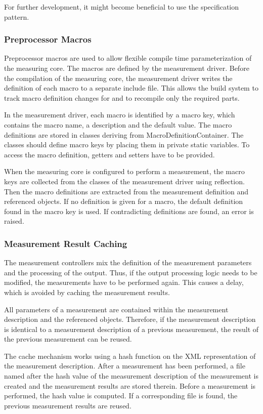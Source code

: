 \documentclass[a4paper,12pt]{article}
\newlength{\imgwidth}
\newcommand{\umlDiagram}[1]{%
	\settowidth{\imgwidth}{\texttt{[image: out/diagrams/\#1.pdf]}}%
	\setlength{\imgwidth}{\minof{0.5\imgwidth}{\textwidth}}%
	\par\vskip0.5cm\noindent\makebox[\textwidth][c]{%
	\texttt{[image: out/diagrams/\#1.pdf]}%
}\vskip0.5cm}
\begin{document}
For further development, it might become beneficial to use the specification
pattern. 

\subsubsection{Preprocessor Macros}
Preprocessor macros are used to allow flexible compile time parameterization of
the measuring core. The macros are defined by the measurement driver. Before the
compilation of the measuring core, the measurement driver writes the definition
of each macro to a separate include file. This allows the build system to track
macro definition changes for and to recompile only the required parts.

In the measurement driver, each macro is identified by a macro key, which
contains the macro name, a description and the default value. The macro
definitions are stored in classes deriving from MacroDefinitionContainer. The
classes should define macro keys by placing them in private static variables. To
access the macro definition, getters and setters have to be provided. 

When the measuring core is configured to perform a measurement, the macro keys
are collected from the classes of the measurement driver using reflection. Then
the macro definitions are extracted from the measurement definition and
referenced objects. If no definition is given for a macro, the default
definition found in the macro key is used. If contradicting definitions are
found, an error is raised.

\umlDiagram{measurementDriver/MacroDefinitions}

\subsubsection{Measurement Result Caching}
The measurement controllers mix the definition of the measurement parameters and
the processing of the output. Thus, if the output processing logic needs to be
modified, the measurements have to be performed again. This causes a delay,
which is avoided by caching the measurement results. 

All parameters of a measurement are contained within the measurement description
and the referenced objects. Therefore, if the measurement description is
identical to a measurement description of a previous measurement, the result of
the previous measurement can be reused. 

The cache mechanism works using a hash function on the XML representation of the
measurement description. After a measurement has been performed, a file named
after the hash value of the measurement description of the measurement is created
and the measurement results are stored therein. Before a measurement is
performed, the hash value is computed. If a corresponding file is found, the
previous measurement results are reused.
\end{document}

